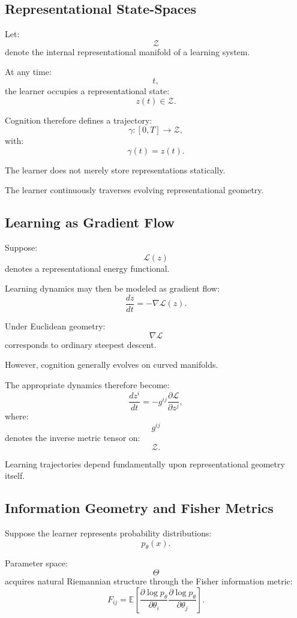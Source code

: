 \documentclass[12pt,a4paper]{article}
\begin{document}
\subsection{Representational State-Spaces}

Let:
\[
\mathcal{Z}
\]
denote the internal representational manifold of a learning system.

At any time:
\[
t,
\]
the learner occupies a representational state:
\[
z(t)
\in
\mathcal{Z}.
\]

Cognition therefore defines a trajectory:
\[
\gamma :
[0,T]
\rightarrow
\mathcal{Z},
\]
with:
\[
\gamma(t)=z(t).
\]

The learner does not merely store representations statically.

The learner continuously traverses evolving representational geometry.

\subsection{Learning as Gradient Flow}

Suppose:
\[
\mathcal{L}(z)
\]
denotes a representational energy functional.

Learning dynamics may then be modeled as gradient flow:
\[
\frac{dz}{dt}
=
-
\nabla
\mathcal{L}(z).
\]

Under Euclidean geometry:
\[
\nabla
\mathcal{L}
\]
corresponds to ordinary steepest descent.

However, cognition generally evolves on curved manifolds.

The appropriate dynamics therefore become:
\[
\frac{dz^i}{dt}
=
-
g^{ij}
\frac{\partial \mathcal{L}}{\partial z^j},
\]
where:
\[
g^{ij}
\]
denotes the inverse metric tensor on:
\[
\mathcal{Z}.
\]

Learning trajectories depend fundamentally upon representational geometry itself.

\subsection{Information Geometry and Fisher Metrics}

Suppose the learner represents probability distributions:
\[
p_\theta(x).
\]

Parameter space:
\[
\Theta
\]
acquires natural Riemannian structure through the Fisher information metric:
\[
F_{ij}
=
\mathbb{E}
\left[
\frac{\partial \log p_\theta}{\partial \theta_i}
\frac{\partial \log p_\theta}{\partial \theta_j}
\right].
\]
\end{document}
